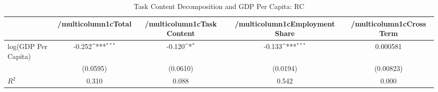\begin{table}[htbp]\centering
\def\sym#1{\ifmmode^{#1}\else\(^{#1}\)\fi}
\caption{Task Content Decomposition and GDP Per Capita: RC}
\begin{tabular}{l*{4}{c}}
\hline\hline
            &/multicolumn{1}{c}{Total}&/multicolumn{1}{c}{Task Content}&/multicolumn{1}{c}{Employment Share}&/multicolumn{1}{c}{Cross Term}\\
\hline
log(GDP Per Capita)&      -0.252\sym{***}&      -0.120\sym{*}  &      -0.133\sym{***}&    0.000581         \\
            &    (0.0595)         &    (0.0610)         &    (0.0194)         &   (0.00823)         \\
\(R^{2}\)   &       0.310         &       0.088         &       0.542         &       0.000         \\
\hline\hline
\end{tabular}
\end{table}

